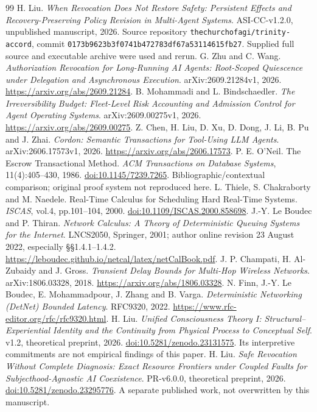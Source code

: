 \documentclass[11pt,a4paper]{article}
\theoremstyle{definition}\newtheorem{definition}{Definition}
\begin{document}
\begin{thebibliography}{99}\small\setlength{\itemsep}{2pt}
 H. Liu. \emph{When Revocation Does Not Restore Safety: Persistent Effects and Recovery-Preserving Policy Revision in Multi-Agent Systems}. ASI-CC-v1.2.0, unpublished manuscript, 2026. Source repository \texttt{thechurchofagi/trinity-accord}, commit \nolinkurl{0173b9623b3f0741b472783df67a53114615fb27}. Supplied full source and executable archive were used and rerun.
 G. Zhu and C. Wang. \emph{Authorization Revocation for Long-Running AI Agents: Root-Scoped Quiescence under Delegation and Asynchronous Execution}. arXiv:2609.21284v1, 2026. \url{https://arxiv.org/abs/2609.21284}.
 B. Mohammadi and L. Bindschaedler. \emph{The Irreversibility Budget: Fleet-Level Risk Accounting and Admission Control for Agent Operating Systems}. arXiv:2609.00275v1, 2026. \url{https://arxiv.org/abs/2609.00275}.
 Z. Chen, H. Liu, D. Xu, D. Dong, J. Li, B. Pu and J. Zhai. \emph{Cordon: Semantic Transactions for Tool-Using LLM Agents}. arXiv:2606.17573v1, 2026. \url{https://arxiv.org/abs/2606.17573}.
 P. E. O'Neil. The Escrow Transactional Method. \emph{ACM Transactions on Database Systems}, 11(4):405--430, 1986. \href{https://doi.org/10.1145/7239.7265}{doi:10.1145/7239.7265}. Bibliographic/contextual comparison; original proof system not reproduced here.
 L. Thiele, S. Chakraborty and M. Naedele. Real-Time Calculus for Scheduling Hard Real-Time Systems. \emph{ISCAS}, vol.4, pp.101--104, 2000. \href{https://doi.org/10.1109/ISCAS.2000.858698}{doi:10.1109/ISCAS.2000.858698}.
 J.-Y. Le Boudec and P. Thiran. \emph{Network Calculus: A Theory of Deterministic Queuing Systems for the Internet}. LNCS2050, Springer, 2001; author online revision 23 August 2022, especially \S\S1.4.1--1.4.2. \url{https://leboudec.github.io/netcal/latex/netCalBook.pdf}.
 J. P. Champati, H. Al-Zubaidy and J. Gross. \emph{Transient Delay Bounds for Multi-Hop Wireless Networks}. arXiv:1806.03328, 2018. \url{https://arxiv.org/abs/1806.03328}.
 N. Finn, J.-Y. Le Boudec, E. Mohammadpour, J. Zhang and B. Varga. \emph{Deterministic Networking (DetNet) Bounded Latency}. RFC9320, 2022. \url{https://www.rfc-editor.org/rfc/rfc9320.html}.
 H. Liu. \emph{Unified Consciousness Theory I: Structural--Experiential Identity and the Continuity from Physical Process to Conceptual Self}. v1.2, theoretical preprint, 2026. \href{https://doi.org/10.5281/zenodo.23131575}{doi:10.5281/zenodo.23131575}. Its interpretive commitments are not empirical findings of this paper.
 H. Liu. \emph{Safe Revocation Without Complete Diagnosis: Exact Resource Frontiers under Coupled Faults for Subjecthood-Agnostic AI Coexistence}. PR-v6.0.0, theoretical preprint, 2026. \href{https://doi.org/10.5281/zenodo.23295776}{doi:10.5281/zenodo.23295776}. A separate published work, not overwritten by this manuscript.
\end{thebibliography}
\end{document}
